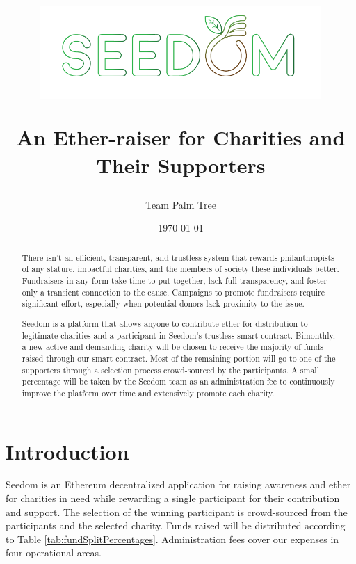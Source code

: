 \documentclass[11pt]{article}
\begin{document}
\title{%
\begin{center}
\includegraphics[width=0.8\textwidth]{seedom6.pdf}
\end{center}
\large An Ether-raiser for Charities and Their Supporters \\[1mm]}
\author{Team Palm Tree}
\date{\today}
\maketitle

\begin{abstract}

There isn't an efficient, transparent, and trustless system that rewards philanthropists of any stature, impactful charities, and the members of society these individuals better. Fundraisers in any form take time to put together, lack full transparency, and foster only a transient connection to the cause. Campaigns to promote fundraisers require significant effort, especially when potential donors lack proximity to the issue.

Seedom is a platform that allows anyone to contribute ether for distribution to legitimate charities and a participant in Seedom's trustless smart contract. Bimonthly, a new active and demanding charity will be chosen to receive the majority of funds raised through our smart contract. Most of the remaining portion will go to one of the supporters through a selection process crowd-sourced by the participants. A small percentage will be taken by the Seedom team as an administration fee to continuously improve the platform over time and extensively promote each charity.

\end{abstract}
\pagebreak

\tableofcontents
\pagebreak

\section{Introduction}

Seedom is an Ethereum decentralized application for raising awareness and ether for charities in need while rewarding a single participant for their contribution and support. The selection of the winning participant is crowd-sourced from the participants and the selected charity. Funds raised will be distributed according to Table \ref{tab:fundSplitPercentages}. Administration fees cover our expenses in four operational areas.
\end{document}
